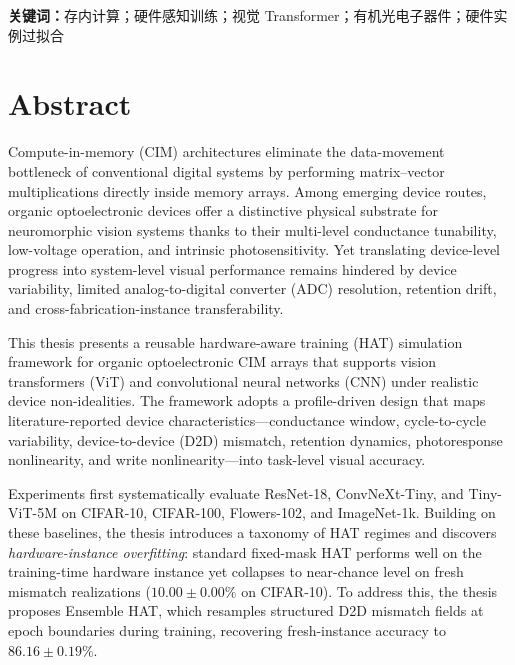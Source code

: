 \vspace{1em}
\noindent\textbf{关键词：}存内计算；硬件感知训练；视觉 Transformer；有机光电子器件；硬件实例过拟合

\vspace{2em}

\chapter*{Abstract}

Compute-in-memory (CIM) architectures eliminate the data-movement bottleneck of conventional digital systems by performing matrix--vector multiplications directly inside memory arrays.
Among emerging device routes, organic optoelectronic devices offer a distinctive physical substrate for neuromorphic vision systems thanks to their multi-level conductance tunability, low-voltage operation, and intrinsic photosensitivity.
Yet translating device-level progress into system-level visual performance remains hindered by device variability, limited analog-to-digital converter (ADC) resolution, retention drift, and cross-fabrication-instance transferability.

This thesis presents a reusable hardware-aware training (HAT) simulation framework for organic optoelectronic CIM arrays that supports vision transformers (ViT) and convolutional neural networks (CNN) under realistic device non-idealities.
The framework adopts a profile-driven design that maps literature-reported device characteristics---conductance window, cycle-to-cycle variability, device-to-device (D2D) mismatch, retention dynamics, photoresponse nonlinearity, and write nonlinearity---into task-level visual accuracy.

Experiments first systematically evaluate ResNet-18, ConvNeXt-Tiny, and Tiny-ViT-5M on CIFAR-10, CIFAR-100, Flowers-102, and ImageNet-1k.
Building on these baselines, the thesis introduces a taxonomy of HAT regimes and discovers \emph{hardware-instance overfitting}:
standard fixed-mask HAT performs well on the training-time hardware instance yet collapses to near-chance level on fresh mismatch realizations ($10.00\pm0.00\%$ on CIFAR-10).
To address this, the thesis proposes Ensemble HAT, which resamples structured D2D mismatch fields at epoch boundaries during training, recovering fresh-instance accuracy to $86.16\pm0.19\%$.

